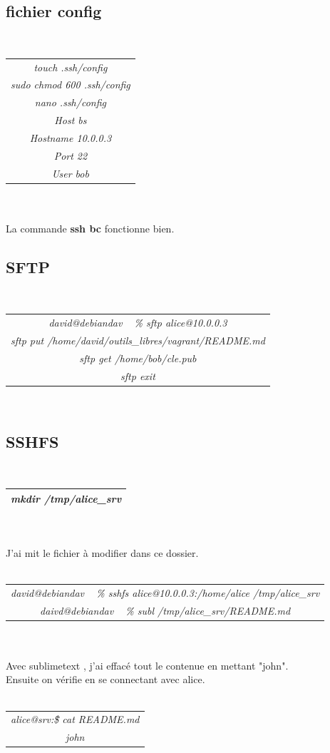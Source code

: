 \documentclass{report}
\begin{document}
\subsection{fichier config}
\\
\begin{tabular}{|c|}
\hline
\textit{touch .ssh/config} \\ 
\textit{sudo chmod 600 .ssh/config} \\
\textit{nano .ssh/config} \\
\hline
\textit{Host bs} \\
\textit{Hostname 10.0.0.3} \\
\textit{Port 22} \\
\textit{User bob} \\
\hline
\end{tabular}
\\
\\
La commande \textbf{ssh bc} fonctionne bien.

\subsection{SFTP}
\\
\begin{tabular}{|c|}
\hline
\textit{david@debiandav ~ \% sftp alice@10.0.0.3} \\
\textit{sftp\> put /home/david/outils\_libres/vagrant/README.md} \\
\textit{sftp\> get /home/bob/cle.pub} \\
\textit{sftp\> exit} \\
\hline
\end{tabular}
\\
\subsection{SSHFS}
\\
\begin{tabular}{|c|}
\hline
\textit{mkdir /tmp/alice\_srv} \\
\hline
\end{tabular}
\\
\\
J'ai mit le fichier à modifier dans ce dossier. \\
\\
\begin{tabular}{|c|}
\hline
\textit{david@debiandav ~ \% sshfs alice@10.0.0.3:/home/alice /tmp/alice\_srv} \\
\textit{daivd@debiandav ~ \% subl /tmp/alice\_srv/README.md} \\
\hline
\end{tabular}
\\
\\
Avec sublimetext , j'ai effacé tout le contenue en mettant "john". \\
Ensuite on vérifie en se connectant avec alice. \\
\\
\begin{tabular}{|c|}
\hline
\textit{alice@srv:\~\$ cat README.md} \\
\textit{john} \\
\hline
\end{tabular}
\\
\end{document}
